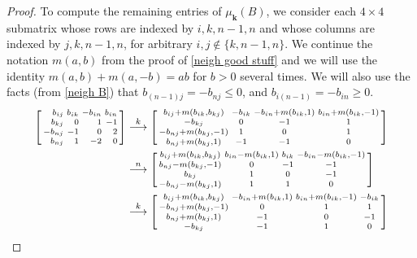 \documentclass{amsart}
\theoremstyle{definition}
\theoremstyle{remark}
\numberwithin{equation}{section}
\newcommand{\sgn}{\operatorname{sgn}}
\newcommand{\set}[1]{{\lbrace #1 \rbrace}}
\newcommand{\0}{{\mathbf{0}}}
\newcommand{\kk}{{\boldsymbol{k}}}
\begin{document}
\begin{proof}
To compute the remaining entries of $\mu_\kk(B)$, we consider each $4\times4$ submatrix whose rows are indexed by $i,k,n-1,n$ and whose columns are indexed by $j,k,n-1,n$, for arbitrary $i,j\not\in\set{k,n-1,n}$.
We continue the notation $m(a,b)$ from the proof of \cref{neigh good stuff} and we will use the identity $m(a,b)+m(a,-b)=ab$ for $b>0$ several times.
We will also use the facts (from \cref{neigh B}) that $b_{(n-1)j}=-b_{nj}\le0$, and $b_{i(n-1)}=-b_{in}\ge0$.
\begin{align*}
\begin{bsmallmatrix*}[r]
b_{ij}&b_{ik}&-b_{in}&b_{in}\\
b_{kj}&0&1&-1\\
-b_{nj}&-1&0&2\\
b_{nj}&1&-2&0
\end{bsmallmatrix*}
&\overset{k}{\longrightarrow}
\begin{bsmallmatrix*}
b_{ij}+m(b_{ik},b_{kj}) & -b_{ik} & -b_{in}+m(b_{ik},1) & b_{in}+m(b_{ik},-1)\\
-b_{kj} & 0 & -1 & 1\\
-b_{nj}+m(b_{kj},-1) & 1 & 0 & 1\\
b_{nj}+m(b_{kj},1) & -1 & -1 & 0
\end{bsmallmatrix*}\\
&\overset{n}{\longrightarrow}
\begin{bsmallmatrix*}
b_{ij}+m(b_{ik},b_{kj}) & b_{in}-m(b_{ik},1) & b_{ik} & -b_{in}-m(b_{ik},-1)\\
b_{nj}-m(b_{kj},-1) & 0 & -1 & -1\\
b_{kj} & 1 & 0 & -1\\
-b_{nj}-m(b_{kj},1) & 1 & 1 & 0
\end{bsmallmatrix*}\\
&\overset{k}{\longrightarrow}
\begin{bsmallmatrix*}
b_{ij}+m(b_{ik},b_{kj}) & -b_{in}+m(b_{ik},1) & b_{in}+m(b_{ik},-1) & -b_{ik}\\
-b_{nj}+m(b_{kj},-1) & 0 & 1 & 1\\
b_{nj}+m(b_{kj},1)  & -1 & 0 & -1\\
-b_{kj}& -1 & 1 & 0
\end{bsmallmatrix*}\\

\end{align*}
\end{proof}
\end{document}
